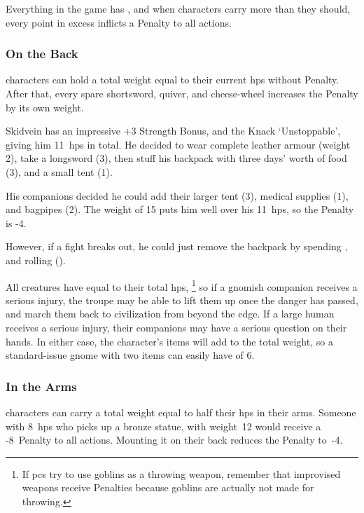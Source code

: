 \begin{multicols}{2}

\noindent%
Everything in the game has , and when characters carry more than they should, every point in excess inflicts a Penalty to all actions.


\subsubsection{On the Back}
characters can hold a total \gls{weight} equal to their current \glspl{hp} without Penalty.
After that, every spare shortsword, quiver, and cheese-wheel increases the Penalty by its own \gls{weight}.

\begin{exampletext}
  Skidvein has an impressive +3 Strength Bonus, and the Knack `Unstoppable', giving him 11~\glspl{hp} in total.
  He decided to wear complete leather armour (\gls{weight} 2), take a longsword (3), then stuff his backpack with three days' worth of food (3), and a small tent (1).

  His companions decided he could add their larger tent (3), medical supplies (1), and bagpipes (2).
  The \gls{weight} of 15 puts him well over his 11~\glspl{hp}, so the Penalty is -4.

  However, if a fight breaks out, he could just remove the backpack by spending , and rolling  (\tn[10]).
\end{exampletext}

All creatures have  equal to their total \glspl{hp},%
\footnote{If \glspl{pc} try to use goblins as a throwing weapon, remember that improvised weapons receive Penalties because goblins are actually not made for throwing.}
so if a gnomish companion receives a serious injury, the troupe may be able to lift them up once the danger has passed, and march them back to civilization from beyond the \gls{edge}.
If a large human receives a serious injury, their companions may have a serious question on their hands.
In either case, the character's items will add to the total \gls{weight}, so a standard-issue gnome with two items can easily have  of 6.

\subsubsection{In the Arms}
characters can carry a total \gls{weight} equal to half their \glspl{hp} in their arms.
Someone with 8~\glspl{hp} who picks up a bronze statue, with \gls{weight}~12 would receive a -8~Penalty to all actions.
Mounting it on their back reduces the Penalty to~-4.


\end{multicols}
